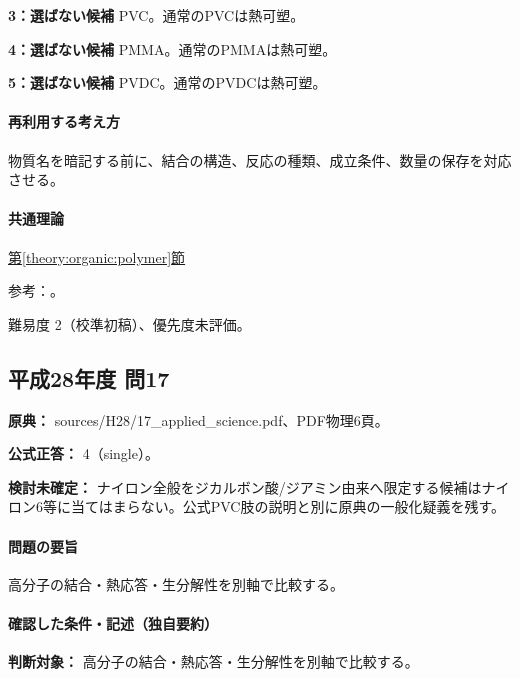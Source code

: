 \noindent\textbf{3：選ばない候補} PVC。通常のPVCは熱可塑。\par

\noindent\textbf{4：選ばない候補} PMMA。通常のPMMAは熱可塑。\par

\noindent\textbf{5：選ばない候補} PVDC。通常のPVDCは熱可塑。\par

\paragraph{再利用する考え方} 物質名を暗記する前に、結合の構造、反応の種類、成立条件、数量の保存を対応させる。

\paragraph{共通理論} \hyperref[theory:organic:polymer]{第\ref*{theory:organic:polymer}節}

\par 参考：\cite{organic_physical,organic_enpla}。

\par 難易度 2（校準初稿）、優先度未評価。

\subsection{平成28年度 問17}
\label{q:h28-reg-applied-17}

\noindent\textbf{原典：} sources/H28/17\_applied\_science.pdf、PDF物理6頁。

\textbf{公式正答：} 4（single）。

\par\textbf{検討未確定：} ナイロン全般をジカルボン酸/ジアミン由来へ限定する候補はナイロン6等に当てはまらない。公式PVC肢の説明と別に原典の一般化疑義を残す。

\paragraph{問題の要旨} 高分子の結合・熱応答・生分解性を別軸で比較する。

\paragraph{確認した条件・記述（独自要約）}\mbox{}\par

\noindent\textbf{判断対象：} 高分子の結合・熱応答・生分解性を別軸で比較する。\par

